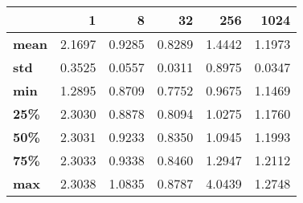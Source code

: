 \begin{tabular}{lrrrrr}
\toprule
{} &       1 &       8 &      32 &     256 &    1024 \\
\midrule
\textbf{mean} &  2.1697 &  0.9285 &  0.8289 &  1.4442 &  1.1973 \\
\textbf{std } &  0.3525 &  0.0557 &  0.0311 &  0.8975 &  0.0347 \\
\textbf{min } &  1.2895 &  0.8709 &  0.7752 &  0.9675 &  1.1469 \\
\textbf{25\% } &  2.3030 &  0.8878 &  0.8094 &  1.0275 &  1.1760 \\
\textbf{50\% } &  2.3031 &  0.9233 &  0.8350 &  1.0945 &  1.1993 \\
\textbf{75\% } &  2.3033 &  0.9338 &  0.8460 &  1.2947 &  1.2112 \\
\textbf{max } &  2.3038 &  1.0835 &  0.8787 &  4.0439 &  1.2748 \\
\bottomrule
\end{tabular}
